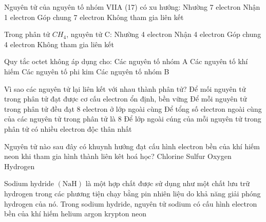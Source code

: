 \begin{ex}
	Nguyên tử của nguyên tố nhóm VIIA (17) có xu hướng:
	\choice
	{Nhường 7 electron}
	{\True Nhận 1 electron}
	{Góp chung 7 electron}
	{Không tham gia liên kết}
\end{ex}
\begin{ex}
	Trong phân tử $CH_4$, nguyên tử C:
	\choice
	{Nhường 4 electron}
	{Nhận 4 electron}
	{\True Góp chung 4 electron}
	{Không tham gia liên kết}
\end{ex}
\begin{ex}
	Quy tắc octet không áp dụng cho:
	\choice
	{Các nguyên tố nhóm A}
	{Các nguyên tố khí hiếm}
	{Các nguyên tố phi kim}
	{\True Các nguyên tố nhóm B}
\end{ex}
\begin{ex}
	Vì sao các nguyên tử lại liên kết với nhau thành phân tử?
	\choice
	{\True Để mối nguyên tử trong phân tử đạt được cơ cấu electron ổn định, bền vững}
	{Để mỗi nguyên tử trong phân tử đều đạt 8 electron ở lớp ngoài cùng}
	{Để tổng số electron ngoài cùng của các nguyên tử trong phân tử là 8 }
	{Để lớp ngoài cúng của mỗi nguyên tử trong phân tử có nhiều electron độc thân nhất}
	\loigiai{}
\end{ex}

\begin{ex}
	Nguyên tử nào sau đây có khuynh hướng đạt cấu hình electron bền của khí hiếm neon khi tham gia hình thành liên kêt hoá học?
	\choice
	{Chlorine}
	{Sulfur}
	{\True Oxygen}
	{Hydrogen}
	\loigiai{}
\end{ex}

\begin{ex}
	Sodium hydride $(\mathrm{NaH})$ là một hợp chất được sử dụng như một chất lưu trữ hydrogen trong các phương tiện chạy bằng pin nhiên liệu do khả năng giải phóng hydrogen của nó. Trong sodium hydride, nguyên tử sodium có cấu hình electron bền của khí hiếm
	\choice
	{helium}
	{argon}
	{krypton}
	{\True neon}
	\loigiai{}
\end{ex}

